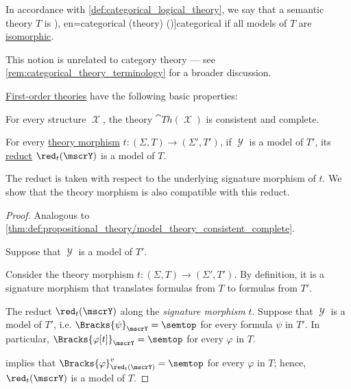 \begin{definition}
\begin{thmenum}
     In accordance with \cref{def:categorical_logical_theory}, we say that a semantic theory \( T \) is \term[ru=категоричная (система аксиом) (\cite[248]{Мальцев1970АлгебраическиеСистемы}), en=categorical (theory) (\cite[def. 2.5.2]{Hinman2005Logic})]{categorical} if all models of \( T \) are \hyperref[def:fol_isomorphism]{isomorphic}.

    This notion is unrelated to category theory --- see \cref{rem:categorical_theory_terminology} for a broader discussion.
  \end{thmenum}
\end{definition}

\begin{proposition}\label{thm:def:fol_theory}
  \hyperref[def:fol_theory]{First-order theories} have the following basic properties:
  \begin{thmenum}
     For every structure \( \mscrX \), the theory \( \cat{Th}(\mscrX) \) is consistent and complete.

     For every \hyperref[def:fol_theory/morphism]{theory morphism} \( t: (\Sigma, T) \to (\Sigma', T') \), if \( \mscrY \) is a model of \( T' \), its \hyperref[def:fol_reduct_along_morphism]{reduct} \( \red_t(\mscrY) \) is a model of \( T \).

    The reduct is taken with respect to the underlying signature morphism of \( t \). We show that the theory morphism is also compatible with this reduct.
  \end{thmenum}
\end{proposition}
\begin{proof}
   Analogous to \cref{thm:def:propositional_theory/model_theory_consistent_complete}.

   Suppose that \( \mscrY \) is a model of \( T' \).

  Consider the theory morphism \( t: (\Sigma, T) \to (\Sigma', T') \). By definition, it is a signature morphism that translates formulas from \( T \) to formulas from \( T' \).

  The reduct \( \red_t(\mscrY) \) along the \emph{signature morphism} \( t \). Suppose that \( \mscrY \) is a model of \( T' \), i.e. \( \Bracks{\psi}_\mscrY = \semtop \) for every formula \( \psi \) in \( T' \). In particular, \( \Bracks{\varphi[t]}_\mscrY = \semtop \) for every \( \varphi \) in \( T \).

   implies that \( \Bracks{\varphi}_{\red_t(\mscrY)}^v = \semtop \) for every \( \varphi \) in \( T \); hence, \( \red_t(\mscrY) \) is a model of \( T \).
\end{proof}

